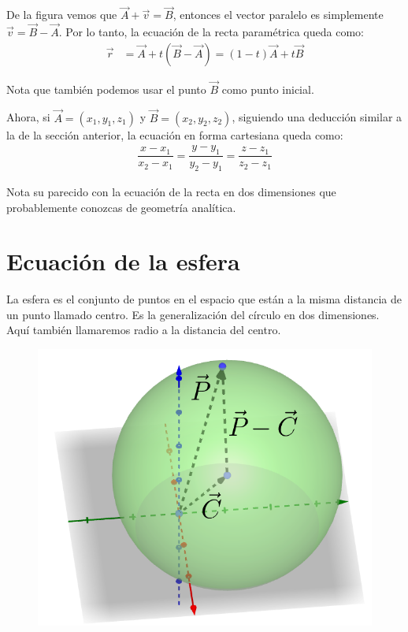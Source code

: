\documentclass[12pt, fleqn]{report}                             %
\theoremstyle{break}                                            %
\newcommand{\Wrap}[1]{\left( #1 \right)}                        %
\begin{document}
            De la figura vemos que $\vec{A}+\vec{v}=\vec{B}$, entonces el vector paralelo es simplemente $\vec{v}=\vec{B}-\vec{A}$. Por lo tanto, la ecuación de la recta paramétrica queda como:
            \begin{align}
                \vec{r} &= \vec{A} + t\Wrap{\vec{B}-\vec{A}} = (1-t)\vec{A}+t\vec{B} \label{lineEquation2}
            \end{align}
            
            Nota que también podemos usar el punto $\vec{B}$ como punto inicial.
            
            Ahora, si $\vec{A}=(x_1, y_1, z_1)$ y $\vec{B}=(x_2, y_2, z_2)$, siguiendo una deducción similar a la de la sección anterior, la ecuación en forma cartesiana queda como:
            \begin{align}
                \dfrac{x - x_1}{x_2 - x_1} = \dfrac{y - y_1}{y_2 - y_1} = \dfrac{z - z_1}{z_2 - z_1} \label{lineEquation3}
            \end{align}
            
            Nota su parecido con la ecuación de la recta en dos dimensiones que probablemente conozcas de geometría analítica.
            
        
        \section{Ecuación de la esfera}
        La esfera es el conjunto de puntos en el espacio que están a la misma distancia de un punto llamado centro. Es la generalización del círculo en dos dimensiones. Aquí también llamaremos radio a la distancia del centro.
        
        \begin{figure}[H]
        	\centering
        	\includegraphics[scale=0.85]{sphere.png}
        \end{figure}
        
\end{document}
